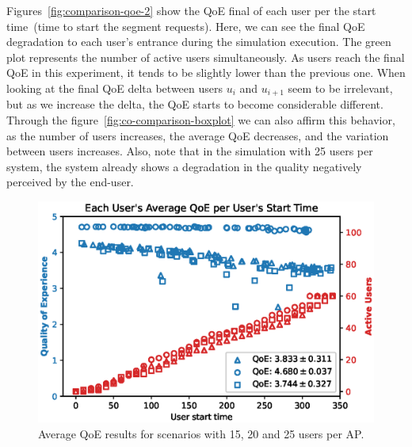 Figures~\ref{fig:comparison-qoe-2} show the QoE final of each user per the start time~(time to start the segment requests). Here, we can see the final QoE degradation to each user's entrance during the simulation execution. The green plot represents the number of active users simultaneously.  
As users reach the final QoE in this experiment, it tends to be slightly lower than the previous one. When looking at the final QoE delta between users $u_{i}$ and $u_{i + 1}$ seem to be irrelevant, but as we increase the delta, the QoE starts to become considerable different. Through the figure~\ref{fig:co-comparison-boxplot} we can also affirm this behavior, as the number of users increases, the average QoE decreases, and the variation between users increases. Also, note that in the simulation with 25 users per system, the system already shows a degradation in the quality negatively perceived by the end-user.



\begin{figure}[!h]
    \centering
    \includegraphics[width=\linewidth]{images/UserQoExUserStartTime15users.eps}
    \vspace{-0.7cm}
    \caption{Average QoE results for scenarios with 15, 20 and 25 users per AP.}
    \label{fig:exp-setup-scenario}
\end{figure}

